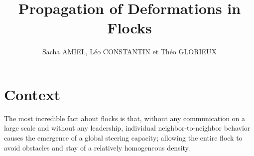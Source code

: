 \documentclass{article}
\title{Propagation of Deformations in Flocks}
\author{Sacha AMIEL, Léo CONSTANTIN et Théo GLORIEUX}
\date{}
\begin{document}
\maketitle

\section*{Context}
The most incredible fact about flocks is that, without any communication on a large scale and without any leadership, individual neighbor-to-neighbor behavior causes the emergence of a global steering capacity; allowing the entire flock to avoid obstacles and stay of a relatively homogeneous density.\\
\end{document}
